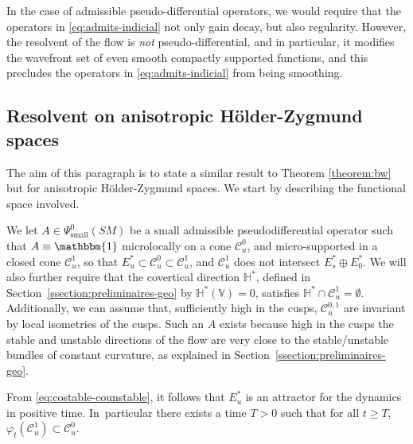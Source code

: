 \documentclass[10pt]{amsart}
\newcommand{\V}{\mathbb{V}}
\newcommand{\HH}{\mathbb{H}}
\newcommand{\mc}{\mathcal}
\theoremstyle{plain}
\theoremstyle{definition}
\begin{document}
In the case of admissible pseudo-differential operators, we would require that the operators in \eqref{eq:admits-indicial} not only gain decay, but also regularity. However, the resolvent of the flow is \emph{not} pseudo-differential, and in particular, it modifies the wavefront set of even smooth compactly supported functions, and this precludes the operators in \eqref{eq:admits-indicial} from being smoothing.

\subsection{Resolvent on anisotropic Hölder-Zygmund spaces}
\label{section:holder}

The aim of this paragraph is to state a similar result to Theorem \ref{theorem:bw} but for anisotropic Hölder-Zygmund spaces. We start by describing the functional space involved.

We let $A \in \Psi^0_{\mathrm{small}}(SM)$ be a small admissible pseudodifferential operator such that $A \equiv \mathbbm{1}$ microlocally on a cone $\mc{C}_u^0$, and micro-supported in a closed cone $\mathcal{C}_u^1$, so that $E^\ast_u\subset \mc{C}_u^0\subset \mc{C}_u^1$, and $\mc{C}_u^1$ does not intersect $E^\ast_s \oplus E^\ast_0$. We will also further require that the covertical direction $\HH^*$, defined in Section~\ref{ssection:preliminaires-geo} by $\HH^*(\V)=0$, satisfies $\HH^* \cap \mc{C}_u^1 = \emptyset$. Additionally, we can assume that, sufficiently high in the cusps, $\mc{C}_u^{0,1}$ are invariant by local isometries of the cusps. Such an $A$ exists because high in the cusps the stable and unstable directions of the flow are very close to the stable/unstable bundles of constant curvature, as explained in Section~\ref{ssection:preliminaires-geo}.

{\color{black}From \eqref{eq:costable-counstable}, it follows that $E^\ast_u$ is an attractor for the dynamics in positive time. In~particular there exists a time $T>0$ such that for all $t\geq T$, $\varphi_t(\mc{C}_u^1) \subset \mc{C}_u^0$.}
\end{document}
